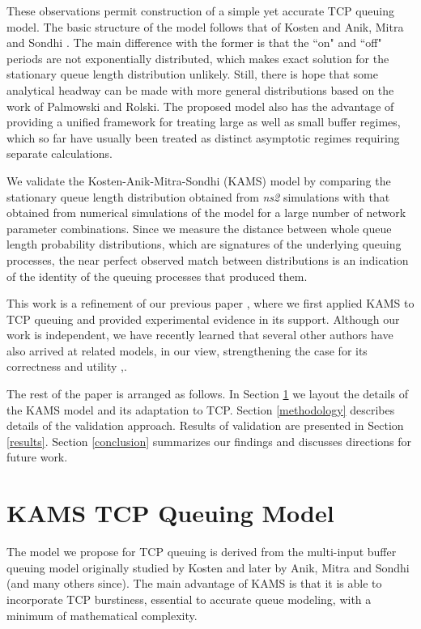 \documentclass{IEEEtran}[10pt,letterpaper,conference]
\begin{document}
These observations permit construction of a simple yet accurate TCP queuing model. The basic structure of the model follows that of Kosten \cite{Kos} and Anik, Mitra and Sondhi \cite{AniMitSon}. The main difference with the former is that the ``on" and ``off" periods are not exponentially distributed, which makes exact solution for the stationary queue length distribution unlikely. Still, there is hope that some analytical headway can be made with more general distributions based on the work of Palmowski and Rolski\cite{PalRol}. The proposed model also has the advantage of providing a unified framework for treating large as well as small buffer regimes, which so far have usually been treated as distinct asymptotic regimes requiring separate calculations.

We validate the Kosten-Anik-Mitra-Sondhi (KAMS) model by comparing the stationary queue length distribution obtained from \emph{ns2} simulations with that obtained from numerical simulations of the model for a large number of network parameter combinations. Since we measure the distance between whole queue length probability distributions, which are signatures of the underlying queuing processes, the near perfect observed match between distributions is an indication of the identity of the queuing processes that produced them.

This work is a refinement of our previous paper \cite{GenMar}, where we first applied KAMS to TCP queuing and provided experimental evidence in its support. Although our work is independent, we have recently learned that several other authors have also arrived at related models, in our view, strengthening the case for its correctness and utility \cite{HuaLiuGonTow},\cite{GoeGau}.

The rest of the paper is arranged as follows. In Section \ref{model} we layout the details of the KAMS model and its adaptation to TCP. Section \ref{methodology} describes details of the validation approach. Results of validation are presented in Section \ref{results}. Section \ref{conclusion} summarizes our findings and discusses directions for future work.

\section{KAMS TCP Queuing Model}
\label{model}

The model we propose for TCP queuing is derived from the multi-input buffer queuing model originally studied by Kosten \cite{Kos} and later by Anik, Mitra and Sondhi \cite{AniMitSon} (and many others since). The main advantage of KAMS is that it is able to incorporate TCP burstiness, essential to accurate queue modeling, with a minimum of mathematical complexity.
\end{document}
